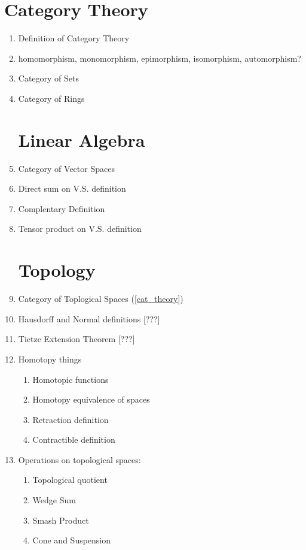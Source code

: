 \documentclass[12]{amsart}
\begin{document}
\section{Category Theory}%
\begin{enumerate}
    \item Definition of Category Theory \label{cat_theory}
    \item homomorphism, monomorphism, epimorphism, isomorphism, automorphism?
    \item Category of Sets
    \item Category of Rings

\section{Linear Algebra}%
    \item Category of Vector Spaces 
    \item Direct sum on V.S. definition
    \item Complentary Definition
    \item Tensor product on V.S. definition

\section{Topology}%
    \item Category of Toplogical Spaces (\ref{cat_theory})
    \item Hausdorff and Normal definitions [???]
    \item Tietze Extension Theorem \label{tietze} [???]
    \item Homotopy things \label{homotopy}
        \begin{enumerate}
            \item Homotopic functions
            \item Homotopy equivalence of spaces 
            \item Retraction definition
            \item Contractible definition \label{contractible}
        \end{enumerate}
    \item Operations on topological spaces: \label{top_ops}
        \begin{enumerate}
            \item Topological quotient
            \item Wedge Sum
            \item Smash Product
            \item Cone and Suspension
        \end{enumerate}


\end{enumerate}
\end{document}
